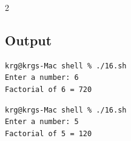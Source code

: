 \documentclass[a4paper,12pt]{article}
\begin{document}
\begin{multicols}{2}
\subsection*{Output}
\begin{lstlisting}[style=outputstyle]
krg@krgs-Mac shell % ./16.sh
Enter a number: 6
Factorial of 6 = 720
\end{lstlisting}
\begin{lstlisting}[style=outputstyle]
krg@krgs-Mac shell % ./16.sh
Enter a number: 5
Factorial of 5 = 120
\end{lstlisting}

\end{multicols}
\newpage

\end{document}
